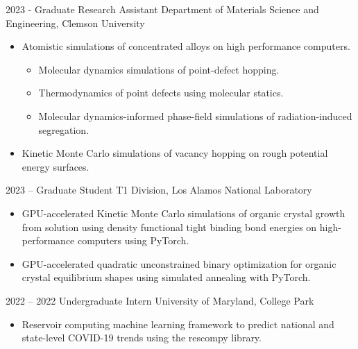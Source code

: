 \documentclass[9pt]{developercv} %
\begin{document}
\vspace{-10 pt}
\begin{entrylist}
	\entry
        {2023 -}
		{Graduate Research Assistant}
		{Department of Materials Science and Engineering, Clemson University}
		{\vspace{-10pt}
        \begin{itemize}[noitemsep,topsep=0pt,parsep=0pt,partopsep=0pt, leftmargin=-1pt]
            \item Atomistic simulations of concentrated alloys on high performance computers.
            \begin{itemize}
                \item Molecular dynamics simulations of point-defect hopping.
                \item Thermodynamics of point defects using molecular statics.
                \item Molecular dynamics-informed phase-field simulations of radiation-induced segregation.
            \end{itemize}
            \item Kinetic Monte Carlo simulations of vacancy hopping on rough potential energy surfaces.
        \end{itemize} 
        }
	\entry
		{2023 --}
		{Graduate Student}
		{T1 Division, Los Alamos National Laboratory}
		{\vspace{-10pt}
        \begin{itemize}[noitemsep,topsep=0pt,parsep=0pt,partopsep=0pt, leftmargin=-1pt]
            \item GPU-accelerated Kinetic Monte Carlo simulations of organic crystal growth from solution using density functional tight binding bond energies on high-performance computers using PyTorch.
            \item GPU-accelerated quadratic unconstrained binary optimization for organic crystal equilibrium shapes using simulated annealing with PyTorch.
        \end{itemize} 
        }
	\entry
		{2022 -- 2022}
		{Undergraduate Intern}
		{University of Maryland, College Park}
		{\vspace{-10pt}
        \begin{itemize}[noitemsep,topsep=0pt,parsep=0pt,partopsep=0pt, leftmargin=-1pt]
            \item Reservoir computing machine learning framework to predict national and state-level COVID-19 trends using the rescompy library.
        \end{itemize} 
}
\end{entrylist}
\end{document}
